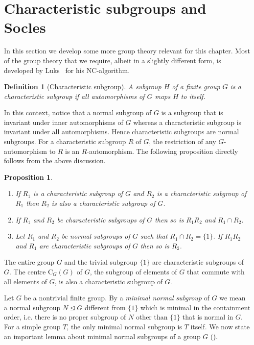 \documentclass[11pt]{madras}%
\newtheorem{proposition}[theorem]{Proposition}
\newtheorem{definition}[theorem]{Definition}
\theoremstyle{remark}
\newcommand{\Cent}[2][]{\ensuremath{\mathrm{C}_{#1}({#2})}}
\begin{document}
\section{Characteristic subgroups and Socles}

In this section we develop some more group theory relevant for this
chapter.  Most of the group theory that we require, albeit in a
slightly different form, is developed by Luks~\cite{luks86parallel}
for his $\mathrm{NC}$-algorithm.


\begin{definition}[Characteristic subgroup]  A subgroup $H$ of a finite group $G$ is a
  \emph{characteristic subgroup} if all automorphisms of $G$ maps $H$
  to itself.
\end{definition}

In this context, notice that a normal subgroup of $G$ is a subgroup
that is invariant under inner automorphisms of $G$ whereas a
characteristic subgroup is invariant under all automorphisms. Hence
characteristic subgroups are normal subgroups.  For a characteristic
subgroup $R$ of $G$, the restriction of any $G$-automorphism to $R$ is
an $R$-automorphism. The following proposition directly follows from
the above discussion.

\begin{proposition}\label{prop-char-subgroup}\hfil
  \begin{enumerate}
  \item If $R_1$ is a characteristic subgroup of $G$ and $R_2$ is a
    characteristic subgroup of $R_1$ then $R_2$ is also a
    characteristic subgroup of $G$.
  \item If $R_1$ and $R_2$ be characteristic subgroups of $G$ then so
    is $R_1R_2$ and $R_1 \cap R_2$.
  \item Let $R_1$ and $R_2$ be normal subgroups of $G$ such that
    $R_1\cap R_2 = \{ 1 \}$. If $R_1 R_2$ and $R_1$ are characteristic
    subgroups of $G$ then so is $R_2$.
  \end{enumerate}
\end{proposition}

The entire group $G$ and the trivial subgroup $\{ 1 \}$ are
characteristic subgroups of $G$. The centre $\Cent[G]{G}$ of $G$, the
subgroup of elements of $G$ that commute with all elements of $G$, is
also a characteristic subgroup of $G$.

Let $G$ be a nontrivial finite group. By a \emph{minimal normal
  subgroup} of $G$ we mean a normal subgroup $N \unlhd G$ different
from $\{ 1 \}$ which is minimal in the containment order, i.e. there
is no proper subgroup of $N$ other than $\{ 1 \}$ that is normal in
$G$. For a simple group $T$, the only minimal normal subgroup is $T$
itself. We now state an important lemma about minimal normal subgroups
of a group $G$ (\cite[Theorem 4.3A]{dixon91permutationbook}).
\end{document}
